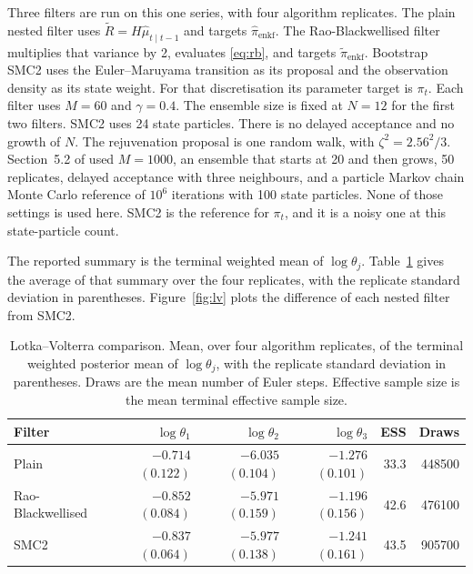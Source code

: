 Three filters are run on this one series, with four algorithm replicates. The plain nested filter uses \(\tilde{R} = H\hat{\mu}_{t\mid t-1}\) and targets \(\hat{\pi}_{\mathrm{enkf}}\). The Rao-Blackwellised filter multiplies that variance by 2, evaluates \eqref{eq:rb}, and targets \(\tilde{\pi}_{\mathrm{enkf}}\). Bootstrap SMC2 uses the Euler--Maruyama transition as its proposal and the observation density as its state weight. For that discretisation its parameter target is \(\pi_t\). Each filter uses \(M = 60\) and \(\gamma = 0.4\). The ensemble size is fixed at \(N = 12\) for the first two filters. SMC2 uses 24 state particles. There is no delayed acceptance and no growth of \(N\). The rejuvenation proposal is one random walk, with \(\zeta^{2} = 2.56^{2}/3\). Section~5.2 of \citet{golightly2026} used \(M = 1000\), an ensemble that starts at 20 and then grows, 50 replicates, delayed acceptance with three neighbours, and a particle Markov chain Monte Carlo reference of \(10^{6}\) iterations with 100 state particles. None of those settings is used here. SMC2 is the reference for \(\pi_t\), and it is a noisy one at this state-particle count.

The reported summary is the terminal weighted mean of \(\log\theta_j\). Table~\ref{tab:lv} gives the average of that summary over the four replicates, with the replicate standard deviation in parentheses. Figure~\ref{fig:lv} plots the difference of each nested filter from SMC2.

\begin{table}[htbp]
\centering
\caption{Lotka--Volterra comparison. Mean, over four algorithm replicates, of the terminal weighted posterior mean of \(\log\theta_j\), with the replicate standard deviation in parentheses. Draws are the mean number of Euler steps. Effective sample size is the mean terminal effective sample size.}
\label{tab:lv}
\begin{tabular}{lrrrrr}
\toprule
Filter & \(\log\theta_1\) & \(\log\theta_2\) & \(\log\theta_3\) & ESS & Draws \\
\midrule
Plain & $-0.714$ $(0.122)$ & $-6.035$ $(0.104)$ & $-1.276$ $(0.101)$ & 33.3 & 448500 \\
Rao-Blackwellised & $-0.852$ $(0.084)$ & $-5.971$ $(0.159)$ & $-1.196$ $(0.156)$ & 42.6 & 476100 \\
SMC2 & $-0.837$ $(0.064)$ & $-5.977$ $(0.138)$ & $-1.241$ $(0.161)$ & 43.5 & 905700 \\
\bottomrule
\end{tabular}
\end{table}

